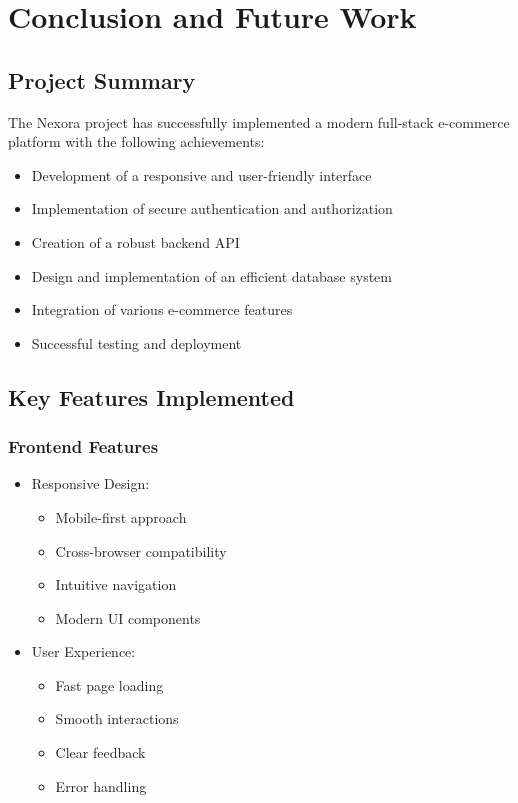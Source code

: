 \chapter{Conclusion and Future Work}
 
\section{Project Summary}
The Nexora project has successfully implemented a modern full-stack e-commerce platform with the following achievements:
\begin{itemize}
    \item Development of a responsive and user-friendly interface
    \item Implementation of secure authentication and authorization
    \item Creation of a robust backend API
    \item Design and implementation of an efficient database system
    \item Integration of various e-commerce features
    \item Successful testing and deployment
\end{itemize}

\section{Key Features Implemented}
\subsection{Frontend Features}
\begin{itemize}
    \item Responsive Design:
    \begin{itemize}
        \item Mobile-first approach
        \item Cross-browser compatibility
        \item Intuitive navigation
        \item Modern UI components
    \end{itemize}
    \item User Experience:
    \begin{itemize}
        \item Fast page loading
        \item Smooth interactions
        \item Clear feedback
        \item Error handling
    \end{itemize}
\end{itemize}

